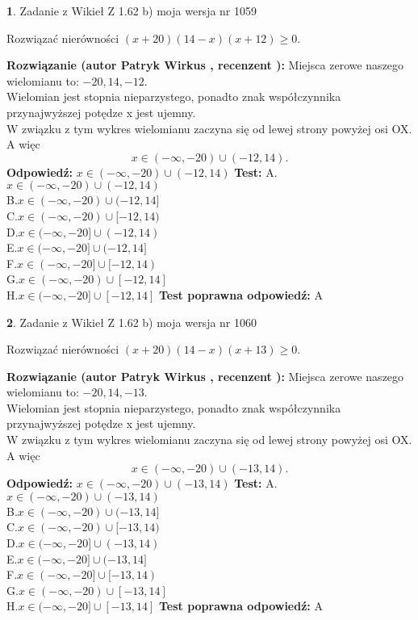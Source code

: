 \documentclass[12pt, a4paper]{article}
\theoremstyle{definition} %
\newtheorem{zad}{}
\newcommand{\zadStart}[1]{\begin{zad}#1\newline}
\newcommand{\zadStop}{\end{zad}}
\newcommand{\rozwStart}[2]{\noindent \textbf{Rozwiązanie (autor #1 , recenzent #2): }\newline}
\newcommand{\rozwStop}{\newline}
\newcommand{\odpStart}{\noindent \textbf{Odpowiedź:}\newline}
\newcommand{\odpStop}{\newline}
\newcommand{\testStart}{\noindent \textbf{Test:}\newline}
\newcommand{\testStop}{\newline}
\newcommand{\kluczStart}{\noindent \textbf{Test poprawna odpowiedź:}\newline}
\newcommand{\kluczStop}{\newline}
\begin{document}
\zadStart{Zadanie z Wikieł Z 1.62 b) moja wersja nr 1059}

Rozwiązać nierówności $(x+20)(14-x)(x+12)\ge0$.
\zadStop
\rozwStart{Patryk Wirkus}{}
Miejsca zerowe naszego wielomianu to: $-20, 14, -12$.\\
Wielomian jest stopnia nieparzystego, ponadto znak współczynnika przy\linebreak najwyższej potędze x jest ujemny.\\ W związku z tym wykres wielomianu zaczyna się od lewej strony powyżej osi OX. A więc $$x \in (-\infty,-20) \cup (-12,14).$$
\rozwStop
\odpStart
$x \in (-\infty,-20) \cup (-12,14)$
\odpStop
\testStart
A.$x \in (-\infty,-20) \cup (-12,14)$\\
B.$x \in (-\infty,-20) \cup (-12,14]$\\
C.$x \in (-\infty,-20) \cup [-12,14)$\\
D.$x \in (-\infty,-20] \cup (-12,14)$\\
E.$x \in (-\infty,-20] \cup (-12,14]$\\
F.$x \in (-\infty,-20] \cup [-12,14)$\\
G.$x \in (-\infty,-20) \cup [-12,14]$\\
H.$x \in (-\infty,-20] \cup [-12,14]$
\testStop
\kluczStart
A
\kluczStop



\zadStart{Zadanie z Wikieł Z 1.62 b) moja wersja nr 1060}

Rozwiązać nierówności $(x+20)(14-x)(x+13)\ge0$.
\zadStop
\rozwStart{Patryk Wirkus}{}
Miejsca zerowe naszego wielomianu to: $-20, 14, -13$.\\
Wielomian jest stopnia nieparzystego, ponadto znak współczynnika przy\linebreak najwyższej potędze x jest ujemny.\\ W związku z tym wykres wielomianu zaczyna się od lewej strony powyżej osi OX. A więc $$x \in (-\infty,-20) \cup (-13,14).$$
\rozwStop
\odpStart
$x \in (-\infty,-20) \cup (-13,14)$
\odpStop
\testStart
A.$x \in (-\infty,-20) \cup (-13,14)$\\
B.$x \in (-\infty,-20) \cup (-13,14]$\\
C.$x \in (-\infty,-20) \cup [-13,14)$\\
D.$x \in (-\infty,-20] \cup (-13,14)$\\
E.$x \in (-\infty,-20] \cup (-13,14]$\\
F.$x \in (-\infty,-20] \cup [-13,14)$\\
G.$x \in (-\infty,-20) \cup [-13,14]$\\
H.$x \in (-\infty,-20] \cup [-13,14]$
\testStop
\kluczStart
A
\kluczStop
\end{document}
